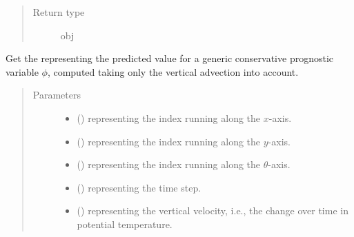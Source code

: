 \documentclass[letterpaper,10pt,english]{sphinxmanual}
\begin{document}
\begin{fulllineitems}
\begin{fulllineitems}
\begin{quote}
\begin{description}
\item[{Return type}] \leavevmode
obj

\end{description}\end{quote}

\end{fulllineitems}


\begin{fulllineitems}
\label{\detokenize{api:tasmania.dycore.flux_isentropic_maccormack.FluxIsentropicMacCormack._get_maccormack_vertical_predicted_value}}
Get the  representing the predicted value for a generic conservative prognostic
variable \(\phi\), computed taking only the vertical advection into account.
\begin{quote}\begin{description}
\item[{Parameters}] \leavevmode\begin{itemize}
\item {} 
 () \textendash{}  representing the index running along the \(x\)-axis.

\item {} 
 () \textendash{}  representing the index running along the \(y\)-axis.

\item {} 
 () \textendash{}  representing the index running along the \(\theta\)-axis.

\item {} 
 () \textendash{}  representing the time step.

\item {} 
 () \textendash{}  representing the vertical velocity, i.e., the change over time in potential temperature.


\end{itemize}
\end{description}
\end{quote}
\end{fulllineitems}
\end{fulllineitems}
\end{document}
